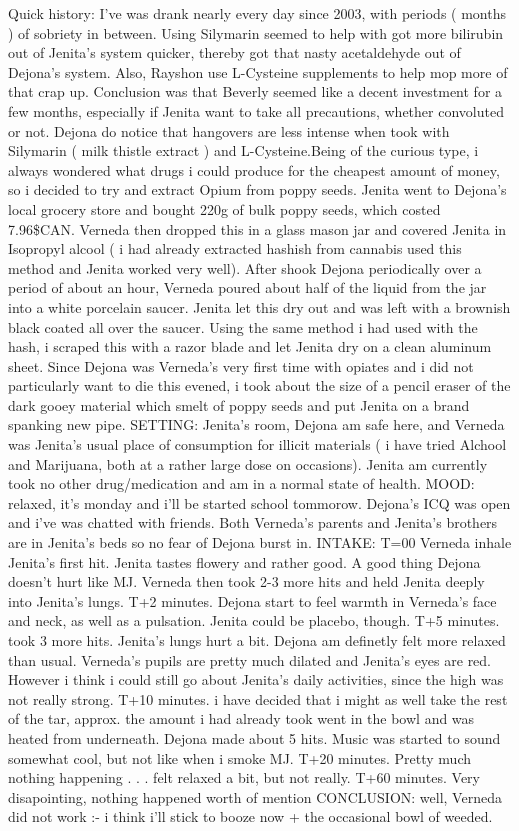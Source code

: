\documentclass[12pt]{book}
\begin{document}
Quick history: I've was drank nearly every day since 2003, with periods ( months ) of sobriety in between. Using Silymarin seemed to help with got more bilirubin out of Jenita's system quicker, thereby got that nasty acetaldehyde out of Dejona's system. Also, Rayshon use L-Cysteine supplements to help mop more of that crap up. Conclusion was that Beverly seemed like a decent investment for a few months, especially if Jenita want to take all precautions, whether convoluted or not. Dejona do notice that hangovers are less intense when took with Silymarin ( milk thistle extract ) and L-Cysteine.Being of the curious type, i always wondered what drugs i could produce for the cheapest amount of money, so i decided to try and extract Opium from poppy seeds. Jenita went to Dejona's local grocery store and bought 220g of bulk poppy seeds, which costed 7.96\$CAN. Verneda then dropped this in a glass mason jar and covered Jenita in Isopropyl alcool (  i had already extracted hashish from cannabis used this method and Jenita worked very well). After shook Dejona periodically over a period of about an hour, Verneda poured about half of the liquid from the jar into a white porcelain saucer. Jenita let this dry out and was left with a brownish black coated all over the saucer. Using the same method i had used with the hash, i scraped this with a razor blade and let Jenita dry on a clean aluminum sheet. Since Dejona was Verneda's very first time with opiates and i did not particularly want to die this evened, i took about the size of a pencil eraser of the dark gooey material which smelt of poppy seeds and put Jenita on a brand spanking new pipe. SETTING: Jenita's room, Dejona am safe here, and Verneda was Jenita's usual place of consumption for illicit materials (  i have tried Alchool and Marijuana, both at a rather large dose on occasions). Jenita am currently took no other drug/medication and am in a normal state of health. MOOD: relaxed, it's monday and i'll be started school tommorow. Dejona's ICQ was open and i've was chatted with friends. Both Verneda's parents and Jenita's brothers are in Jenita's beds so no fear of Dejona burst in. INTAKE: T=00 Verneda inhale Jenita's first hit. Jenita tastes flowery and rather good. A good thing Dejona doesn't hurt like MJ. Verneda then took 2-3 more hits and held Jenita deeply into Jenita's lungs. T+2 minutes. Dejona start to feel warmth in Verneda's face and neck, as well as a pulsation. Jenita could be placebo, though. T+5 minutes. took 3 more hits. Jenita's lungs hurt a bit. Dejona am definetly felt more relaxed than usual. Verneda's pupils are pretty much dilated and Jenita's eyes are red. However i think i could still go about Jenita's daily activities, since the high was not really strong. T+10 minutes. i have decided that i might as well take the rest of the tar, approx. the amount i had already took went in the bowl and was heated from underneath. Dejona made about 5 hits. Music was started to sound somewhat cool, but not like when i smoke MJ. T+20 minutes. Pretty much nothing happening . . .  felt relaxed a bit, but not really. T+60 minutes. Very disapointing, nothing happened worth of mention CONCLUSION: well, Verneda did not work :- i think i'll stick to booze now + the occasional bowl of weeded.
\end{document}
